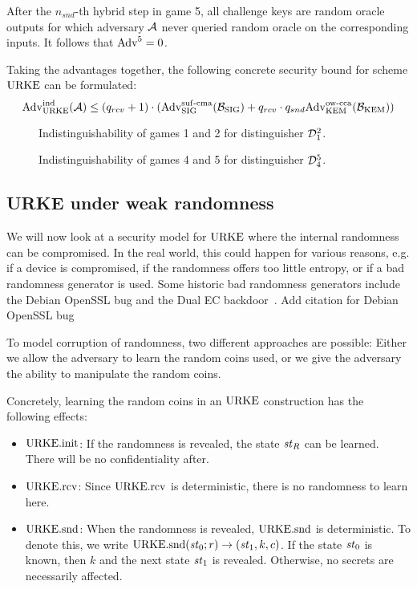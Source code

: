 After the $n_{snd}$-th hybrid step in game 5, all challenge keys are random oracle outputs for which adversary $\mathcal{A}$ never queried random oracle on the corresponding inputs.
It follows that $\mathrm{Adv}^5=0$.

Taking the advantages together, the following concrete security bound for scheme $\mathrm{URKE}$ can be formulated:
\[\mathrm{Adv}_{\mathrm{URKE}}^{\mathrm{ind}}(\mathcal{A}) \leq (q_{rcv}+1)\cdot(\mathrm{Adv}_{\mathrm{SIG}}^{\mathrm{suf}\text{-}\mathrm{cma}}(\mathcal{B}_{\mathrm{SIG}})+q_{rcv}\cdot q_{snd}\mathrm{Adv}_{\mathrm{KEM}}^{\mathrm{ow}\text{-}\mathrm{cca}}(\mathcal{B}_{\mathrm{KEM}}))\] 


\begin{figure}[!ht]
    \centering
    
    \caption{Indistinguishability of games 1 and 2 for distinguisher $\mathcal{D}_1^2$.}
    \label{fig:urke:ind:games1_2}
\end{figure}

\begin{figure}[!ht]
    \centering
    
    \caption{Indistinguishability of games 4 and 5 for distinguisher $\mathcal{D}_4^5$.}
    \label{fig:urke:ind:games4_5}
\end{figure}

\subsection{URKE under weak randomness}
We will now look at a security model for $\mathrm{URKE}$ where the internal randomness can be compromised.
In the real world, this could happen for various reasons, e.g. if a device is compromised, if the randomness offers too little entropy, or if a bad randomness generator is used.
Some historic bad randomness generators include the Debian OpenSSL bug and the Dual EC backdoor~\cite{EPRINT:BerLanNie15}. \alert{Add citation for Debian OpenSSL bug}

To model corruption of randomness, two different approaches are possible:
Either we allow the adversary to learn the random coins used, or we give the adversary the ability to manipulate the random coins.

Concretely, learning the random coins in an $\mathrm{URKE}$ construction has the following effects:
\begin{itemize}
    \item $\mathrm{URKE}.\mathrm{init}$: If the randomness is revealed, the state $\mathit{st}_R$ can be learned. 
    There will be no confidentiality after.
    \item $\mathrm{URKE}.\mathrm{rcv}$: Since $\mathrm{URKE}.\mathrm{rcv}$ is deterministic, there is no randomness to learn here.
    \item $\mathrm{URKE}.\mathrm{snd}$: When the randomness is revealed, $\mathrm{URKE}.\mathrm{snd}$ is deterministic. 
    To denote this, we write $\mathrm{URKE}.\mathrm{snd}(\mathit{st}_0;r)\to(\mathit{st}_1, k, c)$. 
    If the state $\mathit{st}_0$ is known, then $k$ and the next state $\mathit{st}_1$ is revealed.
    Otherwise, no secrets are necessarily affected.
\end{itemize}

